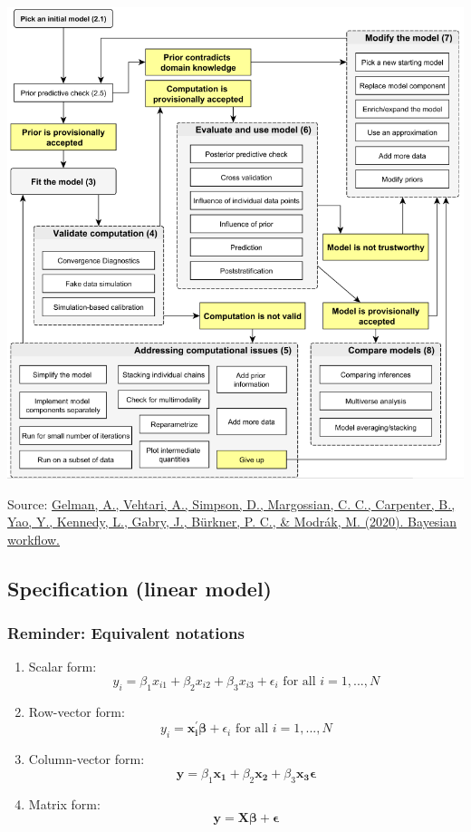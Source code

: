 \documentclass[
  11pt,
]{article}
\providecommand{\tightlist}{%
  \setlength{\itemsep}{0pt}\setlength{\parskip}{0pt}}
\begin{document}
\begin{center}\includegraphics[width=0.9\linewidth]{images/workflow} \end{center}

Source: \href{https://arxiv.org/abs/2011.01808}{Gelman, A., Vehtari, A., Simpson, D., Margossian, C. C., Carpenter, B., Yao, Y., Kennedy, L., Gabry, J., Bürkner, P. C., \& Modrák, M. (2020). Bayesian workflow.}

\hypertarget{specification-linear-model}{%
\subsection{Specification (linear model)}\label{specification-linear-model}}

\hypertarget{reminder-equivalent-notations}{%
\subsubsection{Reminder: Equivalent notations}\label{reminder-equivalent-notations}}

\begin{enumerate}
\def\labelenumi{\arabic{enumi}.}
\tightlist
\item
  Scalar form: \[y_i = \beta_1 x_{i1} + \beta_2 x_{i2} + \beta_3 x_{i3} + \epsilon_i \text{ for all } i=1,...,N\]
\item
  Row-vector form: \[y_i = \mathbf{x_i^{\prime}} \mathbf{\beta} + \epsilon_i  \text{ for all } i=1,...,N\]
\item
  Column-vector form: \[\mathbf{y} = \beta_1 \mathbf{x_{1}} + \beta_2 \mathbf{x_{2}} + \beta_3 \mathbf{x_{3}} \mathbf{\epsilon}\]
\item
  Matrix form: \[\mathbf{y = X \beta + \epsilon}\]
\end{enumerate}
\end{document}
